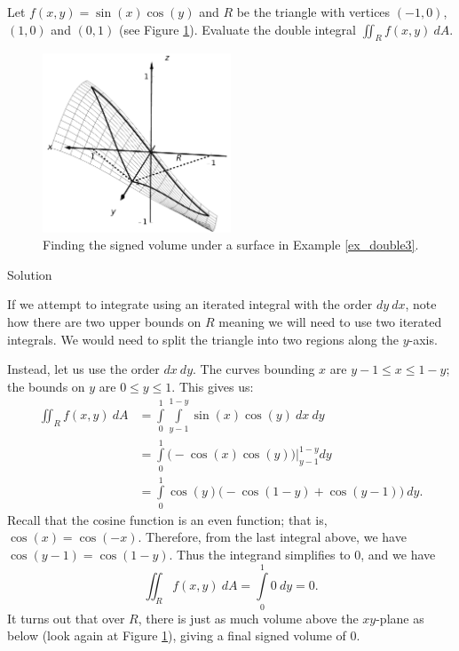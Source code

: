 \begin{example}\label{ex_double3}
Let $f(x,y) = \sin(x)\cos(y)$ and $R$ be the triangle with vertices $(-1,0)$, $(1,0)$ and $(0,1)$ (see Figure \ref{fig_double_9}). Evaluate the double integral $\iint_Rf(x,y)\ dA$.

\begin{figure}[H]
	\begin{center}
			\includegraphics[width=0.5\textwidth]{fig_double_9}
	\caption{Finding the signed volume under a surface in Example \ref{ex_double3}.}
	\label{fig_double_9}
	\end{center}
\end{figure}


Solution 


If we attempt to integrate using an iterated integral with the order $dy\ dx$, note how there are two upper bounds on $R$ meaning we will need to use two iterated integrals. We would need to split the triangle into two regions along the $y$-axis.

Instead, let us use the order $dx\ dy$. The curves bounding $x$ are $y-1\leq x\leq 1-y$; the bounds on $y$ are $0\leq y\leq 1$. This gives us:
\allowdisplaybreaks
\begin{align*}
\iint_R f(x,y)\ dA &= \int\limits_0^1\int\limits_{y-1}^{1-y}\sin(x)\cos(y)\ dx\ dy\\
		&= \int\limits_0^1\left.\Big( -\cos(x)\cos(y)\Big)\right|_{y-1}^{1-y} dy\\
		&= \int\limits_0^1 \cos(y)\Big(-\cos(1-y) + \cos(y-1)\Big)\ dy.
\end{align*}
Recall that the cosine function is an even function; that is, $\cos(x) = \cos(-x)$. Therefore, from the last integral above, we have $\cos(y-1) = \cos(1-y)$. Thus the integrand simplifies to 0, and we have 
$$
\iint_R f(x,y)\ dA = \int\limits_0^1 0\ dy = 0.
$$
It turns out that over $R$, there is just as much volume above the $xy$-plane as below (look again at Figure \ref{fig_double_9}), giving a final signed volume of 0. 
\end{example}

